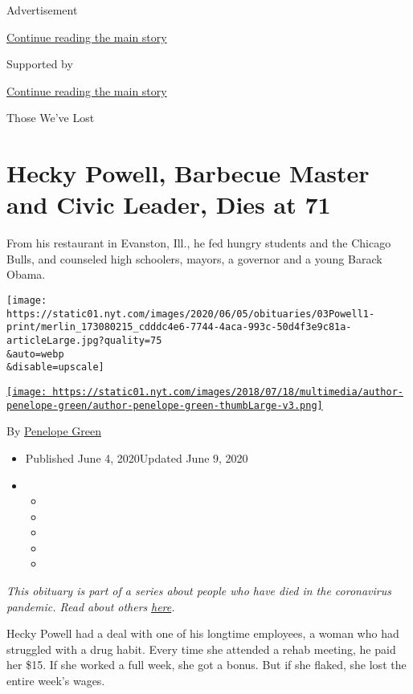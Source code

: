 Advertisement

\protect\hyperlink{after-top}{Continue reading the main story}

Supported by

\protect\hyperlink{after-sponsor}{Continue reading the main story}

Those We've Lost

\hypertarget{hecky-powell-barbecue-master-and-civic-leader-dies-at-71}{%
\section{Hecky Powell, Barbecue Master and Civic Leader, Dies at
71}\label{hecky-powell-barbecue-master-and-civic-leader-dies-at-71}}

From his restaurant in Evanston, Ill., he fed hungry students and the
Chicago Bulls, and counseled high schoolers, mayors, a governor and a
young Barack Obama.

\texttt{[image: https://static01.nyt.com/images/2020/06/05/obituaries/03Powell1-print/merlin\_173080215\_cdddc4e6-7744-4aca-993c-50d4f3e9c81a-articleLarge.jpg?quality=75\\\&auto=webp\\\&disable=upscale]}

\href{https://www.nytimes.com/by/penelope-green}{\texttt{[image: https://static01.nyt.com/images/2018/07/18/multimedia/author-penelope-green/author-penelope-green-thumbLarge-v3.png]}}

By \href{https://www.nytimes.com/by/penelope-green}{Penelope Green}

\begin{itemize}
\item
  Published June 4, 2020Updated June 9, 2020
\item
  \begin{itemize}
  \item
  \item
  \item
  \item
  \item
  \end{itemize}
\end{itemize}

\emph{This obituary is part of a series about people who have died in
the coronavirus pandemic. Read about others}
\href{https://www.nytimes.com/series/people-who-have-died-of-the-coronavirus}{\emph{here}}\emph{.}

Hecky Powell had a deal with one of his longtime employees, a woman who
had struggled with a drug habit. Every time she attended a rehab
meeting, he paid her \$15. If she worked a full week, she got a bonus.
But if she flaked, she lost the entire week's wages.


